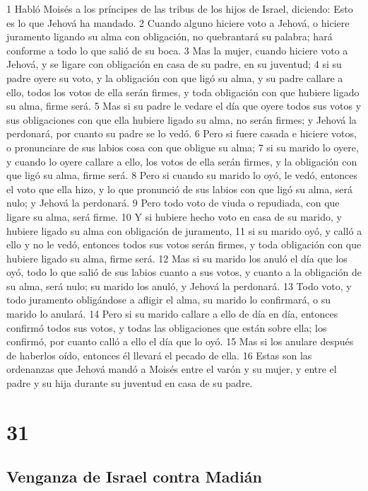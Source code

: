 1 Habló Moisés a los príncipes de las tribus de los hijos de Israel, diciendo: Esto es lo que Jehová ha mandado.
2 Cuando alguno hiciere voto a Jehová, o hiciere juramento ligando su alma con obligación, no quebrantará su palabra; hará conforme a todo lo que salió de su boca.
3 Mas la mujer, cuando hiciere voto a Jehová, y se ligare con obligación en casa de su padre, en su juventud;
4 si su padre oyere su voto, y la obligación con que ligó su alma, y su padre callare a ello, todos los votos de ella serán firmes, y toda obligación con que hubiere ligado su alma, firme será.
5 Mas si su padre le vedare el día que oyere todos sus votos y sus obligaciones con que ella hubiere ligado su alma, no serán firmes; y Jehová la perdonará, por cuanto su padre se lo vedó.
6 Pero si fuere casada e hiciere votos, o pronunciare de sus labios cosa con que obligue su alma;
7 si su marido lo oyere, y cuando lo oyere callare a ello, los votos de ella serán firmes, y la obligación con que ligó su alma, firme será.
8 Pero si cuando su marido lo oyó, le vedó, entonces el voto que ella hizo, y lo que pronunció de sus labios con que ligó su alma, será nulo; y Jehová la perdonará.
9 Pero todo voto de viuda o repudiada, con que ligare su alma, será firme.
10 Y si hubiere hecho voto en casa de su marido, y hubiere ligado su alma con obligación de juramento,
11 si su marido oyó, y calló a ello y no le vedó, entonces todos sus votos serán firmes, y toda obligación con que hubiere ligado su alma, firme será.
12 Mas si su marido los anuló el día que los oyó, todo lo que salió de sus labios cuanto a sus votos, y cuanto a la obligación de su alma, será nulo; su marido los anuló, y Jehová la perdonará.
13 Todo voto, y todo juramento obligándose a afligir el alma, su marido lo confirmará, o su marido lo anulará.
14 Pero si su marido callare a ello de día en día, entonces confirmó todos sus votos, y todas las obligaciones que están sobre ella; los confirmó, por cuanto calló a ello el día que lo oyó.
15 Mas si los anulare después de haberlos oído, entonces él llevará el pecado de ella.
16 Estas son las ordenanzas que Jehová mandó a Moisés entre el varón y su mujer, y entre el padre y su hija durante su juventud en casa de su padre.

\chapter{31}

\section*{Venganza de Israel contra Madián}

